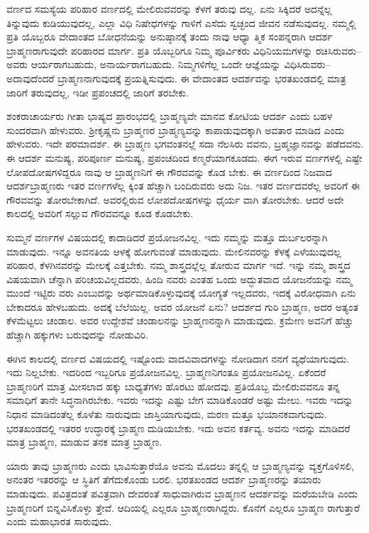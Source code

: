 ವರ್ಣದ ಸಮಸ್ಯೆಯ ಪರಿಹಾರ ವರ್ಣದಲ್ಲಿ ಮೇಲಿರುವವರನ್ನು ಕೆಳಗೆ ತರುವು ದಲ್ಲ. ಏನು ಸಿಕ್ಕಿದರೆ ಅದನ್ನೆಲ್ಲ ತಿನ್ನುವುದು ಕುಡಿಯುವುದಲ್ಲ, ಎಲ್ಲಾ ವಿಧಿ ನಿಷೇಧಗಳನ್ನು ಗಾಳಿಗೆ ಎಸೆದು ಸ್ವಚ್ಛಂದ ಜೀವನ ನಡೆಸುವುದಲ್ಲ. ನಮ್ಮಲ್ಲಿ ಪ್ರತಿ ಯೊಬ್ಬರೂ ವೇದಾಂತದ ಬೋಧನೆಯನ್ನು ಅನುಷ್ಠಾನಕ್ಕೆ ತಂದು ನಾವು ಆಧ್ಯಾ ತ್ಮಿಕ ಸಂಪನ್ನರಾಗಿ ಆದರ್ಶ ಬ್ರಾಹ್ಮಣರಾಗುವುದೇ ಪರಿಹಾರದ ಮಾರ್ಗ. ಪ್ರತಿ ಯೊಬ್ಬರಿಗೂ ನಿಮ್ಮ ಪೂರ್ವಿಕರು ವಿಧಿನಿಯಮಗಳನ್ನು ರಚಿಸಿರುವರು–ಅವರು ಆರ್ಯರಾಗಬಹುದು, ಅನಾರ್ಯರಾಗಬಹುದು. ನಿಮ್ಮಗಳಿಗೆಲ್ಲ ಒಂದೇ ಆಜ್ಞೆಯನ್ನು ವಿಧಿಸಿರುವರು–ಅದಾವುದೆಂದರೆ ಬ್ರಾಹ್ಮಣನಾಗುವುದಕ್ಕೆ ಪ್ರಯತ್ನಿಸುವುದು. ಈ ವೇದಾಂತದ ಆದರ್ಶವನ್ನು ಭರತಖಂಡದಲ್ಲಿ ಮಾತ್ರ ಜಾರಿಗೆ ತರುವುದಲ್ಲ, ಇಡೀ ಪ್ರಪಂಚದಲ್ಲಿ ಜಾರಿಗೆ ತರಬೇಕು.

ಶಂಕರಾಚಾರ್ಯರು ಗೀತಾ ಭಾಷ್ಯದ ಪ್ರಾರಂಭದಲ್ಲಿ ಬ್ರಾಹ್ಮಣ್ಯವೇ ಮಾನವ ಕೋಟಿಯ ಆದರ್ಶ ಎಂದು ಬಹಳ ಸುಂದರವಾಗಿ ಹೇಳುವರು. ಶ್ರೀಕೃಷ್ಣನು ಬ್ರಾಹ್ಮಣರ ಬ್ರಾಹ್ಮಣ್ಯವನ್ನು ಕಾಪಾಡುವುದಕ್ಕಾಗಿ ಅವತಾರ ಮಾಡಿದ ಎಂದು ಹೇಳುವರು. ಇದೇ ಪರಮಾದರ್ಶ. ಈ ಬ್ರಾಹ್ಮಣ ಭಗವಂತನಲ್ಲೆ ಸದಾ ನೆಲಸಿರು ವವನು, ಬ್ರಹ್ಮಜ್ಞಾನವನ್ನು ಪಡೆದವನು. ಈ ಆದರ್ಶ ಮನುಷ್ಯ, ಪರಿಪೂರ್ಣ ಮನುಷ್ಯ, ಪ್ರಪಂಚದಿಂದ ಕಣ್ಮರೆಯಾಗಕೂಡದು. ಈಗ ಇರುವ ವರ್ಣಗಳಲ್ಲಿ ಎಷ್ಟೇ ಲೋಪದೋಷಗಳಿದ್ದರೂ ನಾವು ಆ ಬ್ರಾಹ್ಮಣನಿಗೆ ಈ ಗೌರವವನ್ನು ಕೊಡ ಬೇಕು. ಈ ವರ್ಣದಿಂದ ನಿಜವಾದ ಆದರ್ಶಬ್ರಾಹ್ಮಣರು ಇತರ ವರ್ಣಗಳೆಲ್ಲ ಕ್ಕಿಂತ ಹೆಚ್ಚಾಗಿ ಬಂದಿರುವರು ಅದು ನಿಜ. ಇತರ ವರ್ಣದವರೆಲ್ಲ ಅವರಿಗೆ ಈ ಗೌರವವನ್ನು ತೋರಬೇಕಾಗಿದೆ. ಅವರಲ್ಲಿರುವ ಲೋಪದೋಷಗಳನ್ನು ಧೈರ್ಯ ವಾಗಿ ತೋರಬೇಕು. ಆದರೆ ಅದೇ ಕಾಲದಲ್ಲಿ ಅವರಿಗೆ ಸಲ್ಲುವ ಗೌರವವನ್ನೂ ಕೂಡ ಕೊಡಬೇಕು.

ಸುಮ್ಮನೆ ವರ್ಣಗಳ ವಿಷಯದಲ್ಲಿ ಕಾದಾಡಿದರೆ ಪ್ರಯೋಜನವಿಲ್ಲ. ಇದು ನಮ್ಮನ್ನು ಮತ್ತೂ ದುರ್ಬಲರನ್ನಾಗಿ ಮಾಡುವುದು. ಇನ್ನೂ ಅವನತಿಯ ಆಳಕ್ಕೆ ಹೋಗುವಂತೆ ಮಾಡುವುದು. ಮೇಲಿನವರನ್ನು ಕೆಳಕ್ಕೆ ಎಳೆಯುವುದಲ್ಲ ಪರಿಹಾರ, ಕೆಳಗಿನವರನ್ನು ಮೇಲಕ್ಕೆ ಎತ್ತಬೇಕು. ನಮ್ಮ ಶಾಸ್ತ್ರದಲ್ಲೆಲ್ಲ ತೋರುವ ಮಾರ್ಗ ಇದೆ. ಇನ್ನು ನಮ್ಮ ಶಾಸ್ತ್ರದ ವಿಷಯವಾಗಿ ಚೆನ್ನಾಗಿ ಪರಿಚಯವಿಲ್ಲದವರು, ಹಿಂದಿ ನವರು ಎಂತಹ ಒಂದು ಅದ್ಭುತವಾದ ಯೋಜನೆಯನ್ನು ನಮ್ಮ ಮುಂದೆ ಇಟ್ಟಿರು ವರು ಎಂಬುದನ್ನು ಅರ್ಥಮಾಡಿಕೊಳ್ಳುವುದಕ್ಕೆ ಯೋಗ್ಯತೆ ಇಲ್ಲದವರು, ಇದಕ್ಕೆ ವಿರೋಧವಾಗಿ ಏನು ಬೇಕಾದರೂ ಹೇಳಬಹುದು. ಅದಕ್ಕೆ ಬೆಲೆಯಿಲ್ಲ. ಅವರ ಯೋಜನೆ ಏನು? ಆದರ್ಶದ ಗುರಿ ಬ್ರಾಹ್ಮಣ, ಅದರ ಅತ್ಯಂತ ಕೆಳಮೆಟ್ಟಲು ಚಂಡಾಲ. ಅವರ ಉದ್ದೇಶವೆ ಚಂಡಾಲನನ್ನು ಬ್ರಾಹ್ಮಣನನ್ನಾಗಿ ಮಾಡುವುದು. ಕ್ರಮೇಣ ಅವನಿಗೆ ಹೆಚ್ಚು ಹೆಚ್ಚಾಗಿ ಹಕ್ಕುಗಳು ಬರುವುದನ್ನು ನೋಡುವಿರಿ.

ಈಗಿನ ಕಾಲದಲ್ಲಿ ವರ್ಣದ ವಿಷಯದಲ್ಲಿ ಇಷ್ಟೊಂದು ವಾದವಿವಾದಗಳನ್ನು ನೋಡಿದಾಗ ನನಗೆ ವ್ಯಥೆಯಾಗುವುದು. ಇದು ನಿಲ್ಲಬೇಕು. ಇದರಿಂದ ಇಬ್ಬರಿಗೂ ಪ್ರಯೋಜನವಿಲ್ಲ. ಬ್ರಾಹ್ಮಣನಿಗಂತೂ ಪ್ರಯೋಜನವಿಲ್ಲ. ಏಕೆಂದರೆ ಬ್ರಾಹ್ಮಣರಿಗೆ ಮಾತ್ರ ಮೀಸಲಾದ ಹಕ್ಕು ಬಾಧ್ಯತೆಗಳು ಹೊರಟು ಹೋದವು. ಪ್ರತಿಯೊಬ್ಬ ಮೇಲಿರುವವನೂ ತನ್ನ ಸಮಾಧಿಗೆ ತಾನೇ ಸಿದ್ಧನಾಗಿರಬೇಕು. ಇವರು ಇದನ್ನು ಎಷ್ಟು ಬೇಗ ಮಾಡಿಕೊಂಡರೆ ಅಷ್ಟು ಮೇಲು. ಇವರು ಇದನ್ನು ನಿಧಾನ ಮಾಡಿದಂತೆಲ್ಲ ಕೊಳೆತು ನಾರುವುದು ಜಾಸ್ತಿಯಾಗುವುದು, ಮರಣ ಮತ್ತೂ ಭಯಾನಕವಾಗುವುದು. ಭರತಖಂಡದಲ್ಲಿ ಇತರರ ಉದ್ಧಾರಕ್ಕೆ ಬ್ರಾಹ್ಮಣ ದುಡಿಯಬೇಕು. ಇದು ಅವನ ಕರ್ತವ್ಯ. ಅವನು ಇದನ್ನು ಮಾಡಿದರೆ ಮಾತ್ರ ಬ್ರಾಹ್ಮಣ, ಮಾಡುವ ತನಕ ಮಾತ್ರ ಬ್ರಾಹ್ಮಣ.

ಯಾರು ತಾವು ಬ್ರಾಹ್ಮಣರು ಎಂದು ಭಾವಿಸುತ್ತಾರೆಯೊ ಅವನು ಮೊದಲು ತನ್ನಲ್ಲಿ ಆ ಬ್ರಾಹ್ಮಣ್ಯವನ್ನು ವ್ಯಕ್ತಗೊಳಿಸಲಿ, ಅನಂತರ ಇತರರನ್ನು ಆ ಸ್ಥಿತಿಗೆ ತೆಗೆದುಕೊಂಡು ಬರಲಿ. ಭರತಖಂಡದ ಆದರ್ಶ ಬ್ರಾಹ್ಮಣರನ್ನು ತಯಾರು ಮಾಡುವುದು. ಪವಿತ್ರದಂತೆ ಪವಿತ್ರವಾಗಿ ದೇವರಂತೆ ಸಾಧುವಾಗಿರುವ ಬ್ರಾಹ್ಮಣನ ಆದರ್ಶವನ್ನು ಮರೆಯಬೇಡಿ ಎಂದು ಬ್ರಾಹ್ಮಣರಿಗೆ ಬಿನ್ನವಿಸಿಕೊಳ್ಳು ತ್ತೇವೆ. ಆದಿಯಲ್ಲಿ ಎಲ್ಲರೂ ಬ್ರಾಹ್ಮಣರಾಗಿದ್ದರು. ಕೊನೆಗೆ ಎಲ್ಲರೂ ಬ್ರಾಹ್ಮಣ ರಾಗುತ್ತಾರೆ ಎಂದು ಮಹಾಭಾರತ ಸಾರುವುದು.

